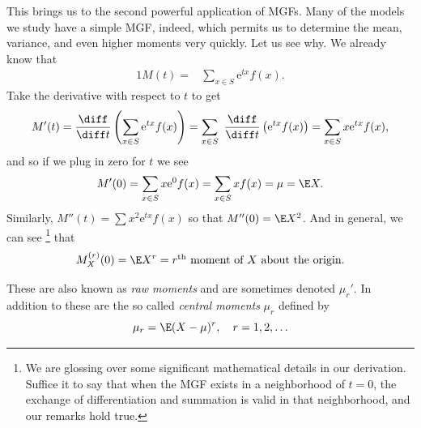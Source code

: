 \documentclass[captions=tableheading]{scrbook}
\begin{document}
This brings us to the second powerful application of MGFs. Many of the models we study have a simple MGF, indeed, which permits us to determine the mean, variance, and even higher moments very quickly. Let us see why. We already know that 
\begin{alignat*}{1}
M(t)= & \sum_{x\in S}\mathrm{e}^{tx}f(x).
\end{alignat*}
Take the derivative with respect to \(t\) to get
\begin{equation}
M'(t)=\frac{\diff}{\diff t}\left(\sum_{x\in S}\mathrm{e}^{tx}f(x)\right)=\sum_{x\in S}\ \frac{\diff}{\diff t}\left(\mathrm{e}^{tx}f(x)\right)=\sum_{x\in S}x\mathrm{e}^{tx}f(x),
\end{equation}
and so if we plug in zero for \(t\) we see
\begin{equation}
M'(0)=\sum_{x\in S}x\mathrm{e}^{0}f(x)=\sum_{x\in S}xf(x)=\mu=\E X.
\end{equation}
Similarly, \(M''(t)=\sum x^{2}\mathrm{e}^{tx}f(x)\) so that \(M''(0)=\E X^{2}\). And in general, we can see
\footnote{We are glossing over some significant mathematical details in our derivation. Suffice it to say that when the MGF exists in a neighborhood of \(t=0\), the exchange of differentiation and summation is valid in that neighborhood, and our remarks hold true.}
that
\begin{equation}
M_{X}^{(r)}(0)=\E X^{r}=\mbox{\ensuremath{r^{\mathrm{th}}} moment of \ensuremath{X} about the origin.}
\end{equation}

These are also known as \emph{raw moments} and are sometimes denoted \(\mu_{r}'\). In addition to these are the so called \emph{central moments} \(\mu_{r}\) defined by
\begin{equation}
\mu_{r}=\E(X-\mu)^{r},\quad r=1,2,\ldots
\end{equation}
\end{document}
